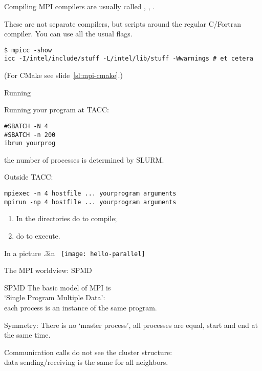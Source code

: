 \begin{numberedframe}{Compiling}
  MPI compilers are usually called ,
  , .

  These are not separate compilers,
  but scripts around the regular C/Fortran compiler. You can use all
  the usual flags.
\begin{verbatim}
$ mpicc -show
icc -I/intel/include/stuff -L/intel/lib/stuff -Wwarnings # et cetera
\end{verbatim}
\begin{full}
  (For CMake see slide~\ref{sl:mpi-cmake}.)
\end{full}
\end{numberedframe}

\begin{numberedframe}{Running}
\begin{tacc}
  Running your program at TACC:
\begin{verbatim}
#SBATCH -N 4
#SBATCH -n 200
ibrun yourprog
\end{verbatim}
  the number of processes is determined by SLURM.
\end{tacc}

Outside TACC:
\begin{verbatim}
mpiexec -n 4 hostfile ... yourprogram arguments
mpirun -np 4 hostfile ... yourprogram arguments
\end{verbatim}
\end{numberedframe}

\begin{exerciseframe}[hello]
  

  \begin{enumerate}
  \item In the directories  do 
     to compile;
  \item do  to execute.
  \end{enumerate}
\end{exerciseframe}

\begin{numberedframe}{In a picture}
  \moveleft .3in \hbox\bgroup
  \texttt{[image: hello-parallel]}
  \egroup
\end{numberedframe}

 {The MPI worldview: SPMD}

\begin{numberedframe}{SPMD}
  The basic model of MPI is\\
  `Single Program Multiple Data':\\
  each process is an instance of the same program.

  Symmetry: There is no `master process', all processes are equal,
  start and end
  at the same time.

  Communication calls do not see the cluster structure:\\
  data sending/receiving is the same for all neighbors.
\end{numberedframe}

